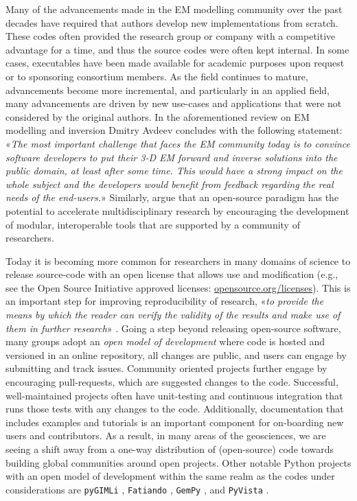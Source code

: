 \documentclass[
    paper,
  ]{geophysics}
\begin{document}
Many of the advancements made in the EM modelling community over the past decades have required that authors develop new implementations from scratch. These codes often provided the research group or company with a competitive advantage for a time, and thus the source codes were often kept internal. In some cases, executables have been made available for academic purposes upon request or to sponsoring consortium members. As the field continues to mature, advancements become more incremental, and particularly in an applied field, many advancements are driven by new use-cases and applications that were not considered by the original authors. In the aforementioned review on EM modelling and inversion Dmitry Avdeev concludes with the following statement: «\emph{The most important challenge that faces the EM community today is to convince software developers to put their 3-D EM forward and inverse solutions into the public domain, at least after some time. This would have a strong impact on the whole subject and the developers would benefit from feedback regarding the real needs of the end-users.}» Similarly, \cite{EXG.19.Oldenburg} argue that an open-source paradigm has the potential to accelerate multidisciplinary research by encouraging the development of modular, interoperable tools that are supported by a community of researchers.

Today it is becoming more common for researchers in many domains of science to release source-code with an open license that allows use and modification (e.g., see the Open Source Initiative approved licenses: \href{https://opensource.org/licenses}{opensource.org/licenses}). This is an important step for improving reproducibility of research, «\emph{to provide the means by which the reader can verify the validity of the results and make use of them in further research}» \citep{GEO.17.Broggini}. Going a step beyond releasing open-source software, many groups adopt an \emph{open model of development} where code is hosted and versioned in an online repository, all changes are public, and users can engage by submitting and track issues. Community oriented projects further engage by encouraging pull-requests, which are suggested changes to the code. Successful, well-maintained projects often have unit-testing and continuous integration that runs those tests with any changes to the code. Additionally, documentation that includes examples and tutorials is an important component for on-boarding new users and contributors. As a result, in many areas of the geosciences, we are seeing a shift away from a one-way distribution of (open-source) code towards building global communities around open projects. Other notable Python projects with an open model of development within the same realm as the codes under considerations are \texttt{pyGIMLi} \citep{CAG.17.Rucker}, \texttt{Fatiando} \citep{JOSS.18.Uieda}, \texttt{GemPy} \citep{GMD.19.DeLaVarga}, and \texttt{PyVista} \citep{JOSS.19.Sullivan}.
\end{document}
